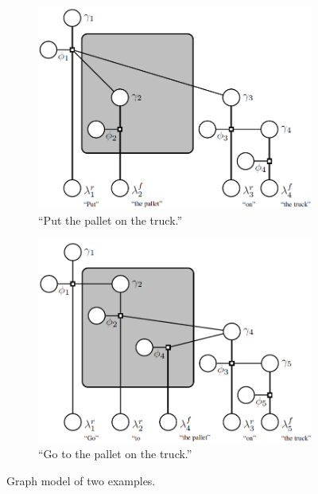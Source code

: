 \documentclass[phd]{byuprop}
\begin{document}
\begin{figure}[htbp]
	\centering
	\begin{subfigure}[t]{0.45\linewidth}
		\centering
		\includegraphics[width=\textwidth]{fig/Induction1}
		\caption{``Put the pallet on the truck.''}
		\label{fig:graph_model:induction1}
	\end{subfigure}  
	\begin{subfigure}[t]{0.45\linewidth}
		\centering
		\includegraphics[width=\textwidth]{fig/Induction2}
		\caption{``Go to the pallet on the truck.''}
		\label{fig:graph_model:induction2}
	\end{subfigure}   
	\caption{Graph model of two examples.}
	\label{fig:graph_model:induction}
\end{figure}
\end{document}
